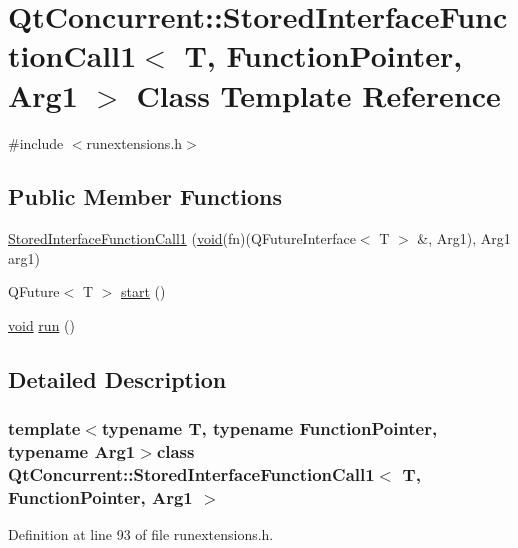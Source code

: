 \hypertarget{class_qt_concurrent_1_1_stored_interface_function_call1}{\section{\-Qt\-Concurrent\-:\-:\-Stored\-Interface\-Function\-Call1$<$ \-T, \-Function\-Pointer, \-Arg1 $>$ \-Class \-Template \-Reference}
\label{class_qt_concurrent_1_1_stored_interface_function_call1}
}


{\ttfamily \#include $<$runextensions.\-h$>$}

\subsection*{\-Public \-Member \-Functions}
\begin{DoxyCompactItemize}
\item 
\hyperlink{class_qt_concurrent_1_1_stored_interface_function_call1_acaa73d2a27f5044aceec2671008363a0}{\-Stored\-Interface\-Function\-Call1} (\hyperlink{group___u_a_v_objects_plugin_ga444cf2ff3f0ecbe028adce838d373f5c}{void}(fn)(\-Q\-Future\-Interface$<$ \-T $>$ \&, \-Arg1), \-Arg1 arg1)
\item 
\-Q\-Future$<$ \-T $>$ \hyperlink{class_qt_concurrent_1_1_stored_interface_function_call1_ae15bac1f0737c7355cbd5ea8eefe5739}{start} ()
\item 
\hyperlink{group___u_a_v_objects_plugin_ga444cf2ff3f0ecbe028adce838d373f5c}{void} \hyperlink{class_qt_concurrent_1_1_stored_interface_function_call1_ac5e1c5c825c5994aa855d11e48742056}{run} ()
\end{DoxyCompactItemize}


\subsection{\-Detailed \-Description}
\subsubsection*{template$<$typename T, typename Function\-Pointer, typename Arg1$>$class Qt\-Concurrent\-::\-Stored\-Interface\-Function\-Call1$<$ T, Function\-Pointer, Arg1 $>$}



\-Definition at line 93 of file runextensions.\-h.



